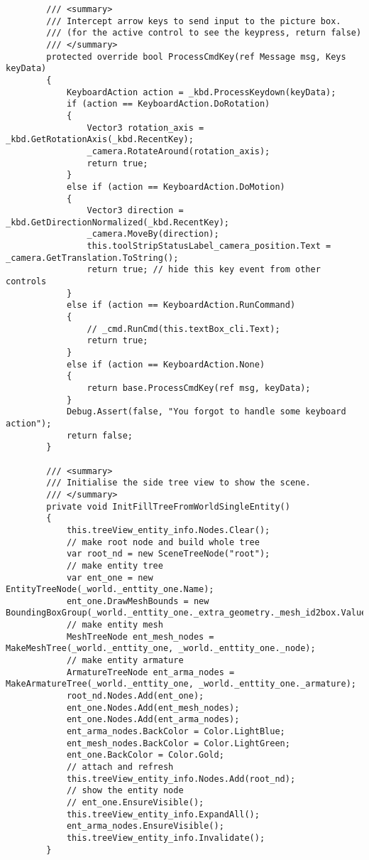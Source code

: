 \begin{scriptsize}
\begin{verbatim}
        /// <summary>
        /// Intercept arrow keys to send input to the picture box.
        /// (for the active control to see the keypress, return false)
        /// </summary>
        protected override bool ProcessCmdKey(ref Message msg, Keys keyData)
        {
            KeyboardAction action = _kbd.ProcessKeydown(keyData);
            if (action == KeyboardAction.DoRotation)
            {
                Vector3 rotation_axis = _kbd.GetRotationAxis(_kbd.RecentKey);
                _camera.RotateAround(rotation_axis);
                return true;
            }
            else if (action == KeyboardAction.DoMotion)
            {
                Vector3 direction = _kbd.GetDirectionNormalized(_kbd.RecentKey);
                _camera.MoveBy(direction);
                this.toolStripStatusLabel_camera_position.Text = _camera.GetTranslation.ToString();
                return true; // hide this key event from other controls
            }
            else if (action == KeyboardAction.RunCommand)
            {
                // _cmd.RunCmd(this.textBox_cli.Text);
                return true;
            }
            else if (action == KeyboardAction.None)
            {
                return base.ProcessCmdKey(ref msg, keyData);
            }
            Debug.Assert(false, "You forgot to handle some keyboard action");
            return false;
        }

        /// <summary>
        /// Initialise the side tree view to show the scene.
        /// </summary>
        private void InitFillTreeFromWorldSingleEntity()
        {
            this.treeView_entity_info.Nodes.Clear();
            // make root node and build whole tree
            var root_nd = new SceneTreeNode("root");
            // make entity tree
            var ent_one = new EntityTreeNode(_world._enttity_one.Name);
            ent_one.DrawMeshBounds = new BoundingBoxGroup(_world._enttity_one._extra_geometry._mesh_id2box.Values);
            // make entity mesh
            MeshTreeNode ent_mesh_nodes = MakeMeshTree(_world._enttity_one, _world._enttity_one._node);
            // make entity armature
            ArmatureTreeNode ent_arma_nodes = MakeArmatureTree(_world._enttity_one, _world._enttity_one._armature);
            root_nd.Nodes.Add(ent_one);
            ent_one.Nodes.Add(ent_mesh_nodes);
            ent_one.Nodes.Add(ent_arma_nodes);
            ent_arma_nodes.BackColor = Color.LightBlue;
            ent_mesh_nodes.BackColor = Color.LightGreen;
            ent_one.BackColor = Color.Gold;
            // attach and refresh
            this.treeView_entity_info.Nodes.Add(root_nd);
            // show the entity node
            // ent_one.EnsureVisible();
            this.treeView_entity_info.ExpandAll();
            ent_arma_nodes.EnsureVisible();
            this.treeView_entity_info.Invalidate();
        }


\end{verbatim}
\end{scriptsize}
